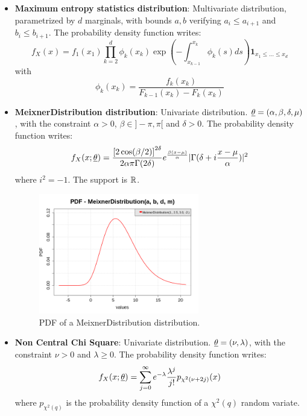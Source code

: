 {\begin{itemize}
\item {\bf Maximum entropy statistics distribution}: Multivariate distribution, parametrized by $d$ marginals, with bounds $a,b$ verifying $a_i \leq a_{i+1}$ and $b_i \leq b_{i+1}$. The probability density function writes:
\begin{equation}
f_X(x) = f_1(x_1) \prod\limits_{k=2}^d \phi_k(x_k) \exp\left(-\int_{x_{k-1}}^{x_k} \phi_k(s) ds\right) \mathbf{1}_{x_1 \leq \dots \leq x_d}
\end{equation}
with
\begin{equation}
\phi_k(x_k) = \frac{f_k(x_k)}{F_{k-1}(x_k)-F_k(x_k)}
\end{equation}

\item {\bf MeixnerDistribution distribution}: Univariate distribution. ${\underline{\theta}} = \left(\alpha, \beta, \delta, \mu \right)$, with the constraint $\alpha>0$, $\beta \in ]-\pi, \pi[$ and $\delta >0$. The probability density function writes:
\begin{equation}
f_X(x;{\underline{\theta}}) = \displaystyle \frac{\left[ 2 \cos(\beta/2)\right]^{2\delta}}{2\alpha \pi \Gamma(2\delta)}e^{\frac{\beta(x-\mu)}{\alpha}}| \Gamma(\delta +i\frac{x-\mu}{\alpha})|^2
\end{equation}
where $i^2=-1$.    The support is ${\mathbb R}$.

\begin{figure}[H]
\begin{center}
\includegraphics[width=7cm]{Figures/pdf_MeixnerDistribution.png}
\caption{PDF of a  MeixnerDistribution distribution.}
\end{center}
\end{figure}



\item {\bf Non Central Chi Square}: Univariate distribution. ${\underline{\theta}} = \left(\nu,\lambda \right)$, with the constraint $\nu>0$ and $\lambda\geq0$. The probability density function writes:
\begin{equation}
f_X(x;{\underline{\theta}}) = \displaystyle \sum_{j=0}^{\infty} e^{-\lambda}\frac{\lambda^j}{j!}p_{\chi^2(\nu+2j)}(x)
\end{equation}
where $p_{\chi^2(q)}$ is the probability density function of a $\chi^2(q)$ random variate.





\end{itemize}}
